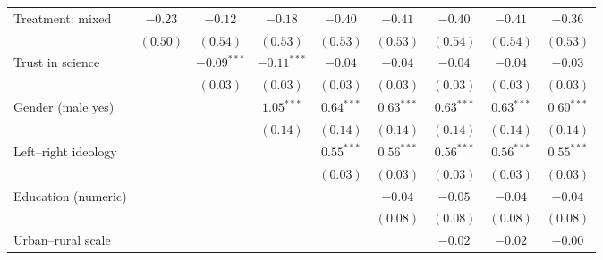 \begin{table}[h]
\begin{center}
\begin{tabular}{l c c c c c c c c}
Treatment: mixed                                                                & $-0.23$      & $-0.12$       & $-0.18$       & $-0.40$       & $-0.41$       & $-0.40$       & $-0.41$       & $-0.36$       \\
                                                                                & $(0.50)$     & $(0.54)$      & $(0.53)$      & $(0.53)$      & $(0.53)$      & $(0.54)$      & $(0.54)$      & $(0.53)$      \\
Trust in science                                                                &              & $-0.09^{***}$ & $-0.11^{***}$ & $-0.04$       & $-0.04$       & $-0.04$       & $-0.04$       & $-0.03$       \\
                                                                                &              & $(0.03)$      & $(0.03)$      & $(0.03)$      & $(0.03)$      & $(0.03)$      & $(0.03)$      & $(0.03)$      \\
Gender (male yes)                                                               &              &               & $1.05^{***}$  & $0.64^{***}$  & $0.63^{***}$  & $0.63^{***}$  & $0.63^{***}$  & $0.60^{***}$  \\
                                                                                &              &               & $(0.14)$      & $(0.14)$      & $(0.14)$      & $(0.14)$      & $(0.14)$      & $(0.14)$      \\
Left–right ideology                                                             &              &               &               & $0.55^{***}$  & $0.56^{***}$  & $0.56^{***}$  & $0.56^{***}$  & $0.55^{***}$  \\
                                                                                &              &               &               & $(0.03)$      & $(0.03)$      & $(0.03)$      & $(0.03)$      & $(0.03)$      \\
Education (numeric)                                                             &              &               &               &               & $-0.04$       & $-0.05$       & $-0.04$       & $-0.04$       \\
                                                                                &              &               &               &               & $(0.08)$      & $(0.08)$      & $(0.08)$      & $(0.08)$      \\
Urban–rural scale                                                               &              &               &               &               &               & $-0.02$       & $-0.02$       & $-0.00$       \\

\end{tabular}
\end{center}
\end{table}
